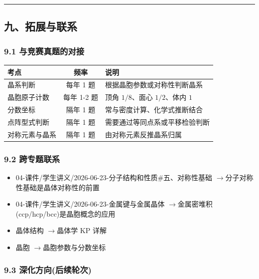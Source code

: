\documentclass[a4paper,11pt]{ctexart}
\providecommand{\tightlist}{\setlength{\itemsep}{0pt}\setlength{\parskip}{0pt}}
\newcounter{none}
\newcommand{\箭}{\ensuremath{\rightarrow}}
\newcommand{\左箭}{\ensuremath{\leftarrow}}
\newcommand{\上箭}{\ensuremath{\uparrow}}
\newcommand{\下箭}{\ensuremath{\downarrow}}
\newcommand{\衡}{\ensuremath{\rightleftharpoons}}
\newcommand{\双箭}{\ensuremath{\leftrightarrow}}
\newcommand{\约等于}{\ensuremath{\approx}}
\newcommand{\小于等于}{\ensuremath{\leq}}
\newcommand{\大于等于}{\ensuremath{\geq}}
\newcommand{\不等于}{\ensuremath{\neq}}
\newcommand{\西格马}{\ensuremath{\sigma}}
\newcommand{\派}{\ensuremath{\pi}}
\begin{document}
\begin{center}\rule{0.5\linewidth}{0.5pt}\end{center}

\subsection{九、拓展与联系}\label{ux4e5dux62d3ux5c55ux4e0eux8054ux7cfb}

\subsubsection{9.1 与竞赛真题的对接}\label{ux4e0eux7adeux8d5bux771fux9898ux7684ux5bf9ux63a5}

{\def\LTcaptype{none} %
\begin{longtable}[]{@{}lcl@{}}
\toprule\noalign{}
考点 & 频率 & 说明 \\
\midrule\noalign{}
\endhead
\bottomrule\noalign{}
\endlastfoot
晶系判断 & 每年 1 题 & 根据晶胞参数或对称性判断晶系 \\
晶胞原子计数 & 每年 1-2 题 & 顶角 \(1/8\)、面心 \(1/2\)、体内 \(1\) \\
分数坐标 & 隔年 1 题 & 常与密度计算、化学式推断结合 \\
点阵型式判断 & 隔年 1 题 & 需要通过等同点系或平移检验判断 \\
对称元素与晶系 & 隔年 1 题 & 由对称元素反推晶系归属 \\
\end{longtable}
}

\subsubsection{9.2 跨专题联系}\label{ux8de8ux4e13ux9898ux8054ux7cfb}

\begin{itemize}
\tightlist
\item
  04-课件/学生讲义/2026-06-23-分子结构和性质\#五、对称性基础 \箭 分子对称性基础是晶体对称性的前置
\item
  04-课件/学生讲义/2026-06-23-金属键与金属晶体 \箭 金属密堆积(ccp/hcp/bcc)是晶胞概念的应用
\item
  晶体结构 \箭 晶体学 KP 详解
\item
  晶胞 \箭 晶胞参数与分数坐标
\end{itemize}

\subsubsection{9.3 深化方向(后续轮次)}\label{ux6df1ux5316ux65b9ux5411ux540eux7eedux8f6eux6b21}
\end{document}
